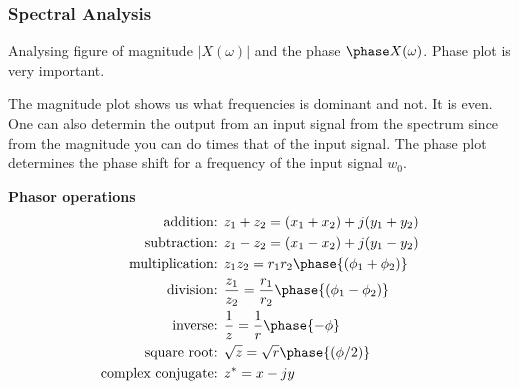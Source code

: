 \subsubsection{Spectral Analysis}
Analysing figure of magnitude $|X(\omega)|$ and the phase $\phase X(\omega)$.
Phase plot is very important. \newpage

The magnitude plot shows us what frequencies is dominant and not. It is even. 
One can also determin the output from an input signal from the spectrum since from the 
magnitude you can do times that of the input signal. 
The phase plot determines the phase shift for a frequency of the input signal $w_0$.




\textbf{Phasor operations}
\begin{align*}
    \text{addition: }& z_1+z_2 = (x_1+x_2)+j(y_1+y_2) \\
    \text{subtraction: }& z_1-z_2 = (x_1-x_2)+j(y_1-y_2) \\
    \text{multiplication: }& z_1z_2 = r_1r_2\phase{(\phi_1+\phi_2)} \\
    \text{division: }& \frac{z_1}{z_2} = \frac{r_1}{r_2}\phase{(\phi_1-\phi_2)} \\
    \text{inverse: }& \frac{1}{z} = \frac{1}{r}\phase{-\phi} \\
    \text{square root: }& \sqrt{z} = \sqrt{r}\phase{(\phi/2)} \\
    \text{complex conjugate: }& z^* = x-jy \\
\end{align*}



